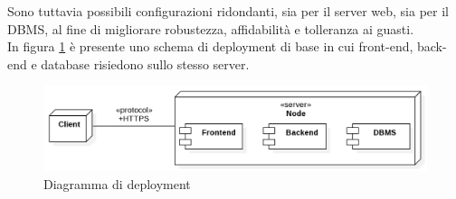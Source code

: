 \documentclass[11pt]{report}
\begin{document}
Sono tuttavia possibili configurazioni ridondanti, sia per il server web, sia per il DBMS, al fine di migliorare robustezza, affidabilità e tolleranza ai guasti.
\\In figura \ref{deployment_diagram} è presente uno schema di deployment di base in cui front-end, back-end e database risiedono sullo stesso server.
\begin{figure}
	\centering
	\includegraphics[scale=0.45]{DeploymentDiagram}
	\caption{Diagramma di deployment \label{deployment_diagram}}
\end{figure}

\pagebreak
\end{document}
